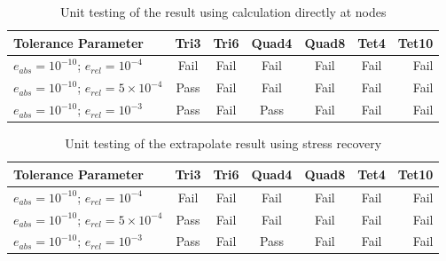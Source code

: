 \begin{table} 		
	\caption{Unit testing of the result using calculation directly at nodes}
	\label{tab: DirectTesting}
\begin{tabular}{l*{5}{c}r} 

	Tolerance Parameter              & Tri3 & Tri6 & Quad4 & Quad8 & Tet4  & Tet10  \\
	\hline
	$e_{abs}=10^{-10}$; $e_{rel}=10^{-4}$ & Fail & Fail & Fail & Fail & Fail & Fail   \\
	$e_{abs}=10^{-10}$; $e_{rel}=5\times10^{-4}$&  Pass& Fail & Fail & Fail & Fail &  Fail  \\
	$e_{abs}=10^{-10}$; $e_{rel}=10^{-3}$ & Pass & Fail & Pass & Fail &  Fail & Fail   \\
   \hline
\end{tabular}
\end{table}

\begin{table} 		
	\caption{Unit testing of the extrapolate result using stress recovery}
	\label{tab: SRTesting}
	\begin{tabular}{l*{5}{c}r} 
		
		Tolerance Parameter    & Tri3 & Tri6 & Quad4 & Quad8 & Tet4  & Tet10  \\
		\hline
		$e_{abs}=10^{-10}$; $e_{rel}=10^{-4}$ & Fail & Fail & Fail & Fail & Fail & Fail   \\
		$e_{abs}=10^{-10}$; $e_{rel}=5\times10^{-4}$&  Pass& Fail & Fail & Fail & Fail &  Fail  \\
		$e_{abs}=10^{-10}$; $e_{rel}=10^{-3}$ & Pass & Fail & Pass & Fail &  Fail & Fail   \\
		\hline
	\end{tabular}
\end{table}

